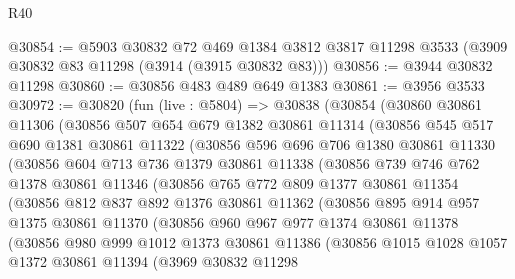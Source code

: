 \begin{lexlean}{R40}
\begin{coremodule}
@30854 := @5903
    @30832
    @72
    @469
    @1384
    @3812
    @3817
    @11298
    @3533
    (@3909 @30832 @83 @11298 (@3914 (@3915 @30832 @83)))
@30856 := @3944 @30832 @11298
@30860 := @30856 @483 @489 @649 @1383
@30861 := @3956 @3533
@30972 := @30820
    (fun (live : @5804) =>
    @30838
      (@30854
        (@30860
          @30861
          @11306
          (@30856
            @507
            @654
            @679
            @1382
            @30861
            @11314
            (@30856
              @545
              @517
              @690
              @1381
              @30861
              @11322
              (@30856
                @596
                @696
                @706
                @1380
                @30861
                @11330
                (@30856
                  @604
                  @713
                  @736
                  @1379
                  @30861
                  @11338
                  (@30856
                    @739
                    @746
                    @762
                    @1378
                    @30861
                    @11346
                    (@30856
                      @765
                      @772
                      @809
                      @1377
                      @30861
                      @11354
                      (@30856
                        @812
                        @837
                        @892
                        @1376
                        @30861
                        @11362
                        (@30856
                          @895
                          @914
                          @957
                          @1375
                          @30861
                          @11370
                          (@30856
                            @960
                            @967
                            @977
                            @1374
                            @30861
                            @11378
                            (@30856
                              @980
                              @999
                              @1012
                              @1373
                              @30861
                              @11386
                              (@30856
                                @1015
                                @1028
                                @1057
                                @1372
                                @30861
                                @11394
                                (@3969
                                  @30832
                                  @11298

\end{coremodule}
\end{lexlean}
